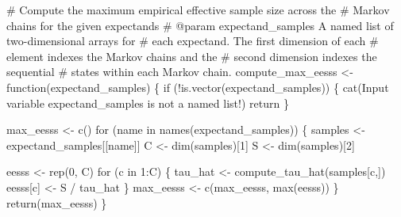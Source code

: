 \documentclass[
  letterpaper,
  DIV=11,
  numbers=noendperiod]{scrartcl}
\newenvironment{Shaded}{\begin{snugshade}}{\end{snugshade}}
\newcommand{\CommentTok}[1]{\textcolor[rgb]{0.37,0.37,0.37}{#1}}
\newcommand{\ControlFlowTok}[1]{\textcolor[rgb]{0.00,0.23,0.31}{#1}}
\newcommand{\DecValTok}[1]{\textcolor[rgb]{0.68,0.00,0.00}{#1}}
\newcommand{\FunctionTok}[1]{\textcolor[rgb]{0.28,0.35,0.67}{#1}}
\newcommand{\NormalTok}[1]{\textcolor[rgb]{0.00,0.23,0.31}{#1}}
\newcommand{\OtherTok}[1]{\textcolor[rgb]{0.00,0.23,0.31}{#1}}
\newcommand{\SpecialCharTok}[1]{\textcolor[rgb]{0.37,0.37,0.37}{#1}}
\newcommand{\StringTok}[1]{\textcolor[rgb]{0.13,0.47,0.30}{#1}}
\begin{document}
\begin{Shaded}
\begin{Highlighting}[]
\CommentTok{\# Compute the maximum empirical effective sample size across the }
\CommentTok{\# Markov chains for the given expectands}
\CommentTok{\# @param expectand\_samples A named list of two{-}dimensional arrays for }
\CommentTok{\#                          each expectand.  The first dimension of each}
\CommentTok{\#                          element indexes the Markov chains and the }
\CommentTok{\#                          second dimension indexes the sequential }
\CommentTok{\#                          states within each Markov chain.}
\NormalTok{compute\_max\_eesss }\OtherTok{\textless{}{-}} \ControlFlowTok{function}\NormalTok{(expectand\_samples) \{}
  \ControlFlowTok{if}\NormalTok{ (}\SpecialCharTok{!}\FunctionTok{is.vector}\NormalTok{(expectand\_samples)) \{}
    \FunctionTok{cat}\NormalTok{(}\StringTok{\textquotesingle{}Input variable \textasciigrave{}expectand\_samples\textasciigrave{} is not a named list!\textquotesingle{}}\NormalTok{)}
\NormalTok{    return}
\NormalTok{  \}}

\NormalTok{  max\_eesss }\OtherTok{\textless{}{-}} \FunctionTok{c}\NormalTok{()}
  \ControlFlowTok{for}\NormalTok{ (name }\ControlFlowTok{in} \FunctionTok{names}\NormalTok{(expectand\_samples)) \{}
\NormalTok{    samples }\OtherTok{\textless{}{-}}\NormalTok{ expectand\_samples[[name]]}
\NormalTok{    C }\OtherTok{\textless{}{-}} \FunctionTok{dim}\NormalTok{(samples)[}\DecValTok{1}\NormalTok{]}
\NormalTok{    S }\OtherTok{\textless{}{-}} \FunctionTok{dim}\NormalTok{(samples)[}\DecValTok{2}\NormalTok{]}
    
\NormalTok{    eesss }\OtherTok{\textless{}{-}} \FunctionTok{rep}\NormalTok{(}\DecValTok{0}\NormalTok{, C)}
    \ControlFlowTok{for}\NormalTok{ (c }\ControlFlowTok{in} \DecValTok{1}\SpecialCharTok{:}\NormalTok{C) \{}
\NormalTok{      tau\_hat }\OtherTok{\textless{}{-}} \FunctionTok{compute\_tau\_hat}\NormalTok{(samples[c,])}
\NormalTok{      eesss[c] }\OtherTok{\textless{}{-}}\NormalTok{ S }\SpecialCharTok{/}\NormalTok{ tau\_hat}
\NormalTok{    \}}
\NormalTok{    max\_eesss }\OtherTok{\textless{}{-}} \FunctionTok{c}\NormalTok{(max\_eesss, }\FunctionTok{max}\NormalTok{(eesss))}
\NormalTok{  \}}
  \FunctionTok{return}\NormalTok{(max\_eesss)}
\NormalTok{\}}


\end{Highlighting}
\end{Shaded}
\end{document}
